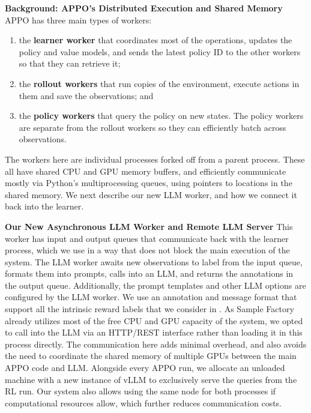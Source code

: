 %

\textbf{Background: APPO's Distributed Execution and Shared Memory}
APPO has three main types of workers:
\begin{enumerate}[itemsep=0pt, topsep=0pt]
\item the \textbf{learner worker} that coordinates most of the operations, updates
the policy and value models, and sends the latest policy ID to the
other workers so that they can retrieve it;
\item the \textbf{rollout workers} that run copies of the environment, execute
actions in them and save the observations; and
\item the \textbf{policy workers} that query the policy on new states. 
The policy workers are separate from the rollout workers so they can efficiently batch
across observations.
\end{enumerate}

The workers here are individual processes forked off from a parent process.
These all have shared CPU and GPU memory buffers, and
efficiently communicate mostly via Python's multiprocessing queues,
using pointers to locations in the shared memory.
We next describe our new LLM worker, and how we connect it back into the learner.

\textbf{Our New Asynchronous LLM Worker and Remote LLM Server}
This worker has input and output queues 
%
that communicate
back with the learner process, which we use in a way that does not block the
%
main execution of the system.
The LLM worker awaits new observations to label from the input queue, 
formats them into
prompts, calls into an LLM, and returns the annotations in the
output queue. 
%
%
%
Additionally, the prompt templates and other LLM options are configured by the LLM worker.
We use an annotation and message format that support all the intrinsic reward
labels that we consider in .
As Sample Factory already utilizes most of the free CPU and GPU
capacity of the system, we opted to call into the LLM via an
HTTP/REST interface rather than loading it in this process directly.
The communication here adds minimal overhead, and also avoids
the need to coordinate the shared memory of multiple GPUs between the main
APPO code and LLM.
%
%
%
Alongside every APPO run, we allocate an unloaded machine
with a new instance of vLLM \citep{kwon2023efficient} to exclusively
serve the queries from the RL run. 
%
Our system also allows using the same node for both processes if computational resources allow, which further reduces communication costs.


